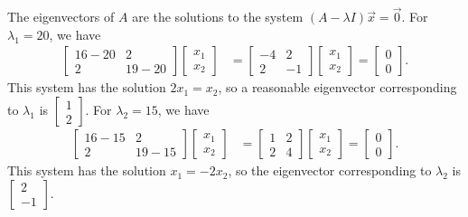 \documentclass{ximera}
\begin{document}
\begin{example}
\begin{explanation}
The eigenvectors of $A$ are the solutions to the system $(A - \lambda I)\vec{x} = \vec{0}$.  For $\lambda_1 = 20$, we have
\begin{align*}
\begin{bmatrix}
16-20 & 2\\2& 19-20
\end{bmatrix}\begin{bmatrix}
x_1\\x_2
\end{bmatrix} &= \begin{bmatrix}
-4 & 2\\2& -1
\end{bmatrix}\begin{bmatrix}
x_1\\x_2
\end{bmatrix} = \begin{bmatrix}
0\\0
\end{bmatrix}.
\end{align*}
This system has the solution $2x_1 = x_2$, so a reasonable eigenvector corresponding to $\lambda_1$ is $\begin{bmatrix}
1\\2
\end{bmatrix}$.  For $\lambda_2 = 15$, we have
\begin{align*}
\begin{bmatrix}
16-15 & 2\\2& 19-15
\end{bmatrix}\begin{bmatrix}
x_1\\x_2
\end{bmatrix} &= \begin{bmatrix}
1 & 2\\2& 4
\end{bmatrix}\begin{bmatrix}
x_1\\x_2
\end{bmatrix} = \begin{bmatrix}
0\\0
\end{bmatrix}.
\end{align*}
This system has the solution $x_1 = -2x_2$, so the eigenvector corresponding to $\lambda_2$ is $\begin{bmatrix}
2\\-1
\end{bmatrix}$.


\end{explanation}
\end{example}
\end{document}
